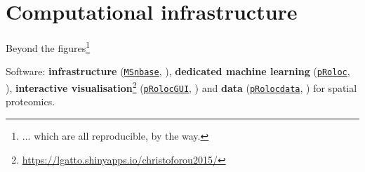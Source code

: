 \section{Computational infrastructure}

\begin{frame}{}

  Beyond the figures\footnote{... which are all reproducible, by the way.}

  \bigskip

  Software: \textbf{infrastructure}
  (\href{http://bioconductor.org/packages/MSnbase}{\texttt{MSnbase}},
  \cite{Gatto:2012}), \textbf{dedicated machine learning}
  (\href{http://bioconductor.org/packages/pRoloc}{\texttt{pRoloc}},
  \cite{Gatto:2014a}), \textbf{interactive
    visualisation}\footnote{\url{https://lgatto.shinyapps.io/christoforou2015/}}
  (\href{http://bioconductor.org/packages/pRolocGUI}{\texttt{pRolocGUI}},
  \cite{pRolocGUI}) and \textbf{data}
  (\href{http://bioconductor.org/packages/pRolocdata}{\texttt{pRolocdata}},
  \cite{Gatto:2014a}) for spatial proteomics.

\end{frame}
